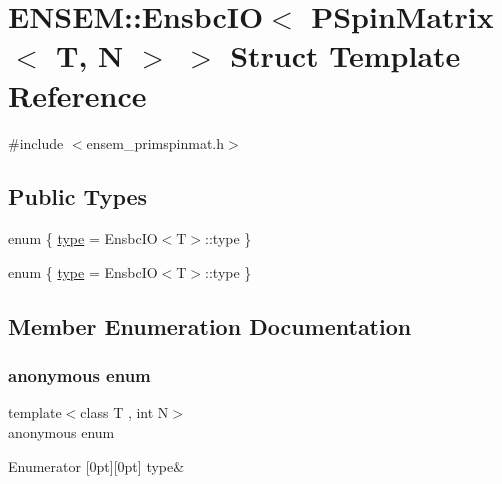 \hypertarget{structENSEM_1_1EnsbcIO_3_01PSpinMatrix_3_01T_00_01N_01_4_01_4}{}\section{E\+N\+S\+EM\+:\+:Ensbc\+IO$<$ P\+Spin\+Matrix$<$ T, N $>$ $>$ Struct Template Reference}
\label{structENSEM_1_1EnsbcIO_3_01PSpinMatrix_3_01T_00_01N_01_4_01_4}


{\ttfamily \#include $<$ensem\+\_\+primspinmat.\+h$>$}

\subsection*{Public Types}
\begin{DoxyCompactItemize}
\item 
enum \{ \mbox{\hyperlink{structENSEM_1_1EnsbcIO_3_01PSpinMatrix_3_01T_00_01N_01_4_01_4_ac4138d959d9dfe07b7e4b78aa7cc52dcaf077b5478aa428f9a9b3c64cb72e8a8c}{type}} = Ensbc\+IO$<$T$>$\+:\+:type
 \}
\item 
enum \{ \mbox{\hyperlink{structENSEM_1_1EnsbcIO_3_01PSpinMatrix_3_01T_00_01N_01_4_01_4_ac4138d959d9dfe07b7e4b78aa7cc52dcaf077b5478aa428f9a9b3c64cb72e8a8c}{type}} = Ensbc\+IO$<$T$>$\+:\+:type
 \}
\end{DoxyCompactItemize}


\subsection{Member Enumeration Documentation}
\mbox{\label{structENSEM_1_1EnsbcIO_3_01PSpinMatrix_3_01T_00_01N_01_4_01_4_ac4138d959d9dfe07b7e4b78aa7cc52dc}} 
\subsubsection{\texorpdfstring{anonymous enum}{anonymous enum}}
{\footnotesize\ttfamily template$<$class T , int N$>$ \\
anonymous enum}

\begin{DoxyEnumFields}{Enumerator}
[0pt][0pt]{}\mbox{\label{structENSEM_1_1EnsbcIO_3_01PSpinMatrix_3_01T_00_01N_01_4_01_4_ac4138d959d9dfe07b7e4b78aa7cc52dcaf077b5478aa428f9a9b3c64cb72e8a8c}} 
type&\\
\hline

\end{DoxyEnumFields}
\mbox{\label{structENSEM_1_1EnsbcIO_3_01PSpinMatrix_3_01T_00_01N_01_4_01_4_a75419b48522aec9529a7c3ef7dbcae8a}} 
